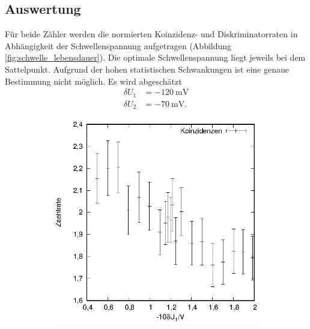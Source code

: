 \subsection{Auswertung}
Für beide Zähler werden die normierten Koinzidenz- und Diskriminatorraten in Abhängigkeit der Schwellenspannung aufgetragen (Abbildung \ref{fig:schwelle_lebensdauer}). Die optimale Schwellenspannung liegt jeweils bei dem Sattelpunkt. Aufgrund der hohen statistischen Schwankungen ist eine genaue Bestimmung nicht möglich. Es wird abgeschätzt
\begin{align*}
  \delta U_1&=-\SI{120}{\milli\volt}\\
  \delta U_2&=-\SI{70}{\milli\volt}.
\end{align*} 

\begin{figure}[h]
  \centering
  \begin{subfigure}[h]{0.5\textwidth}
    \centering
    \includegraphics[width=\textwidth]{data/schwelle_1_koinzidenz.eps}
  \end{subfigure}%
  \begin{subfigure}[h]{0.5\textwidth}
    \centering

\end{subfigure}
\end{figure}
